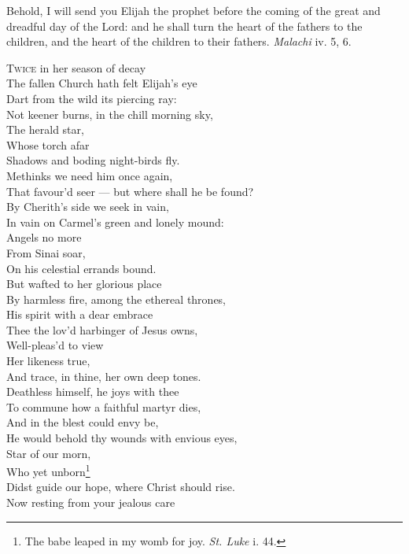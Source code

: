 
Behold, I will send you Elijah the prophet before the coming of the great and dreadful day of the Lord: and he shall turn the heart of the fathers to the children, and the heart of the children to their fathers. \emph{Malachi} iv. 5, 6.

\textsc{Twice} in her season of decay \\
 The fallen Church hath felt Elijah’s eye \\
 Dart from the wild its piercing ray: \\
 Not keener burns, in the chill morning sky, \\
 The herald star, \\
 Whose torch afar \\
 Shadows and boding night-birds fly. \\
  Methinks we need him once again, \\
 That favour’d seer — but where shall he be found? \\
 By Cherith’s side we seek in vain, \\
 In vain on Carmel’s green and lonely mound: \\
 Angels no more \\
 From Sinai soar, \\
 On his celestial errands bound. \\
  But wafted to her glorious place \\
 By harmless fire, among the ethereal thrones, \\
 His spirit with a dear embrace \\
 Thee the lov’d harbinger of Jesus owns, \\
 Well-pleas’d to view \\
 Her likeness true, \\
 And trace, in thine, her own deep tones. \\
  Deathless himself, he joys with thee \\
 To commune how a faithful martyr dies, \\
 And in the blest could envy be, \\
 He would behold thy wounds with envious eyes, \\
 Star of our morn, \\
 Who yet unborn\footnote{The babe leaped in my womb for joy. \emph{St. Luke} i. 44.} \\
 Didst guide our hope, where Christ should rise. \\
  Now resting from your jealous care \\
